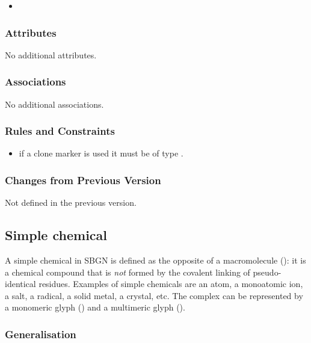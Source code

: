 \begin{itemize}
\item {}
\end{itemize}

\subsubsection{Attributes}

No additional attributes.

\subsubsection{Associations}

No additional associations.

\subsubsection{Rules and Constraints}

\begin{itemize}
\item if a clone marker is used it must be of type .
\end{itemize}

\subsubsection{Changes from Previous Version}

Not defined in the previous version.

\subsection{Simple chemical}
\label{sec:simpleChemical}

A simple chemical in SBGN is defined as the opposite of a
macromolecule (): it is a chemical compound that
is \emph{not} formed by the covalent linking of pseudo-identical
residues.  Examples of simple chemicals are an atom, a monoatomic ion,
a salt, a radical, a solid metal, a crystal, etc. The complex can be
represented by a monomeric glyph () and
a multimeric glyph ().

\subsubsection{Generalisation}


